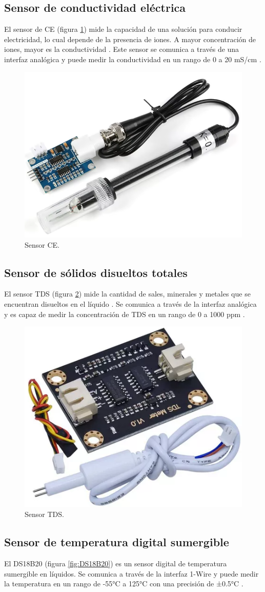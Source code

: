 \subsection{Sensor de conductividad eléctrica}

El sensor de CE (figura \ref{fig:CE}) mide la capacidad de una solución para
conducir electricidad, lo cual depende de la presencia de iones. A mayor
concentración de iones, mayor es la conductividad \cite{MTConductivitySensor}.
Este sensor se comunica a través de una interfaz analógica y puede medir la
conductividad en un rango de 0 a 20 mS/cm \cite{EC-Sensor}.

\begin{figure}[H]
	\centering
	\includegraphics[width=.15\textwidth]{./Images/8.png}
	\caption{Sensor CE.}
	\label{fig:CE}
\end{figure}

\subsection{Sensor de sólidos disueltos totales}

El sensor TDS (figura \ref{fig:TDS}) mide la cantidad de sales, minerales y
metales que se encuentran disueltos en el líquido \cite{TDS-description}. Se
comunica a través de la interfaz analógica y es capaz de medir la concentración
de TDS en un rango de 0 a 1000 ppm \cite{TDS-Sensor}.

\begin{figure}[H]
	\centering
	\includegraphics[width=.15\textwidth]{./Images/9.png}
	\caption{Sensor TDS.}
	\label{fig:TDS}
\end{figure}

\subsection{Sensor de temperatura digital sumergible}

El DS18B20 (figura \ref{fig:DS18B20}) es un sensor digital de temperatura
sumergible en líquidos. Se comunica a través de la interfaz 1-Wire y puede
medir la temperatura en un rango de -55°C a 125°C con una precisión de ±0.5°C
\cite{DS18B20}.

